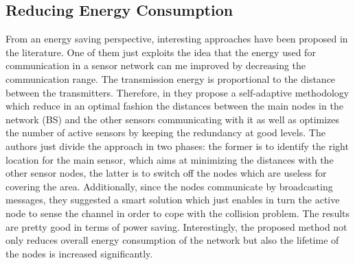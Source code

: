 \subsection*{Reducing Energy Consumption}
From an energy saving perspective, interesting approaches have been proposed in the literature. One of them just exploits the idea that the energy used for communication in a sensor network can me improved by decreasing the communication range. The transmission energy is proportional to the distance between the transmitters. Therefore, in \cite{reduceEnergy} they propose a self-adaptive methodology which reduce in an optimal fashion the distances between the main nodes in the network (BS) and the other sensors communicating with it as well as optimizes the number of active sensors by keeping the redundancy at good levels. 
The authors just divide the approach in two phases: the former is to identify the right location for the main sensor, which aims at minimizing the distances with the other sensor nodes, the latter is to switch off the nodes which are useless for covering the area. Additionally, since the nodes communicate by broadcasting messages, they suggested a smart solution which just enables in turn the active node to sense the channel in order to cope with the collision problem. The results are pretty good in terms of power saving. Interestingly, the proposed method not only reduces overall energy consumption of the network but also the lifetime of the nodes is increased significantly.
